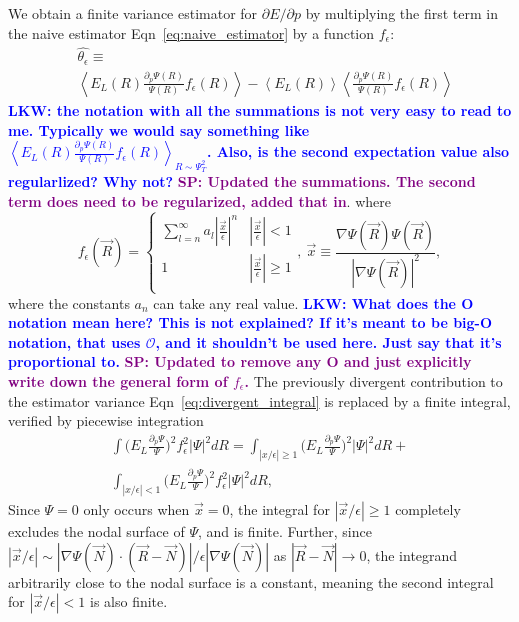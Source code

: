 \documentclass[twocolumn]{revtex4-1}
\newcommand{\lucas}[1]{\textbf{\textcolor{blue}{LKW: #1}}}
\newcommand{\shivesh}[1]{\textbf{\textcolor{purple}{SP: #1}}}
\begin{document}
We obtain a finite variance estimator for $\partial E/\partial p$ by multiplying the first term in the naive estimator Eqn~\ref{eq:naive_estimator} by a function $f_\epsilon$:
\begin{equation}
\begin{split}
&\hat{\theta_\epsilon} \equiv \\ 
&\left\langle E_L(R) \frac{\partial_p \Psi(R)}{\Psi(R)} f_\epsilon(R) \right\rangle - \left\langle E_L(R) \right \rangle \left \langle \frac{\partial_p \Psi(R)}{\Psi(R)} f_\epsilon(R) \right\rangle
\label{eq:regularized_estimator}
\end{split}
\end{equation}
\lucas{the notation with all the summations is not very easy to read to me. Typically we would say something like $\left\langle E_L(R) \frac{\partial_p \Psi(R)}{\Psi(R)} f_\epsilon(R) \right\rangle_{R\sim\Psi_T^2}$. Also, is the second expectation value also regularlized? Why not?}
\shivesh{Updated the summations. The second term does need to be regularized, added that in}.
where 
\begin{equation}
f_\epsilon(\vec{R}) = \begin{cases} 
      \sum_{l=n}^{\infty} a_l |\frac{\vec{x}}{\epsilon}|^n & |\frac{\vec{x}}{\epsilon}| < 1 \\
      1 & |\frac{\vec{x}}{\epsilon}| \ge 1 \\
   \end{cases},\ \vec{x} \equiv \frac{\nabla \Psi(\vec{R}) \Psi(\vec{R})}{|\nabla \Psi(\vec{R})|^2},
\label{eq:regularizing_function}
\end{equation} 
where the constants $a_n$ can take any real value.
\lucas{What does the O notation mean here? This is not explained? If it's meant to be big-O notation, that uses $\mathcal{O}$, and it shouldn't be used here. Just say that it's proportional to.} 
\shivesh{Updated to remove any O and just explicitly write down the general form of $f_\epsilon$.}
The previously divergent contribution to the estimator variance Eqn~\ref{eq:divergent_integral} is replaced by a finite integral, verified by piecewise integration
\begin{equation}
\begin{split}
\int \Big(E_L\frac{\partial_p\Psi}{\Psi}\Big)^2 f_\epsilon^2 |\Psi|^2 dR = \int_{|x/\epsilon|\geq 1} \Big(E_L\frac{\partial_p\Psi}{\Psi}\Big)^2 |\Psi|^2 dR +\\ \int_{|x/\epsilon|< 1} \Big(E_L\frac{\partial_p\Psi}{\Psi}\Big)^2 f_\epsilon^2 |\Psi|^2 dR,
\end{split}
\label{eq:convergent_integral}
\end{equation}
Since $\Psi = 0$ only occurs when $\vec{x} = 0$, the integral for $|\vec{x}/\epsilon|\geq 1$ completely excludes the nodal surface of $\Psi$, and is finite. 
Further, since $|\vec{x}/\epsilon| \sim |\nabla\Psi(\vec{N}) \cdot (\vec{R}-\vec{N})|/\epsilon|\nabla  \Psi(\vec{N})|$ as $|\vec{R} - \vec{N}| \rightarrow 0$, the integrand arbitrarily close to the nodal surface is a constant, meaning the second integral for $|\vec{x}/\epsilon| < 1$ is also finite.
\end{document}
